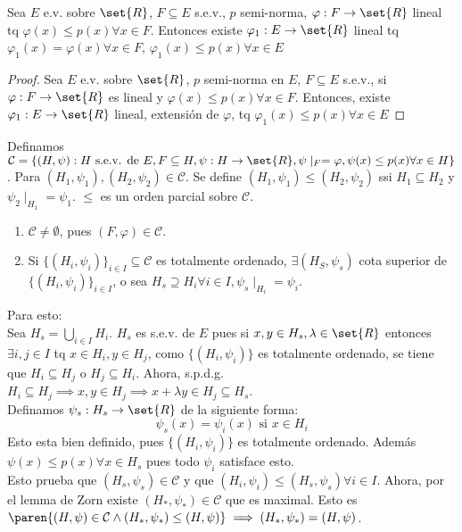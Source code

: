 \documentclass{notetaking}
\begin{document}
\begin{thm}
    Sea \(E\) e.v. sobre \(\set{R}\), \(F\subseteq E\) s.e.v., \(p\) semi-norma, \(\varphi:F\rightarrow\set{R}\) lineal tq \(\varphi(x)\leq p(x)\forall x\in F\). Entonces existe \(\varphi_1:E\rightarrow\set{R}\) lineal tq \(\varphi_1(x)=\varphi(x)\forall x\in F\), \(\varphi_1(x)\leq p(x)\forall x\in E\)
\end{thm}
\begin{proof}
    Sea \(E\) e.v. sobre \(\set{R}\), \(p\) semi-norma en \(E\), \(F\subseteq E\) s.e.v., si \(\varphi:F\rightarrow \set{R}\) es lineal y \(\varphi(x)\leq p(x)\forall x\in F\). Entonces, existe \(\varphi_1:E\rightarrow\set{R}\) lineal, extensión de \(\varphi\), tq \(\varphi_1(x)\leq p(x)\forall x\in E\)
\end{proof}
    Definamos \(\mathcal{C}=\{(H,\psi): H\text{ s.e.v. de }E, F\subseteq H,\psi:H\rightarrow\set{R},\psi\mid_F=\varphi,\psi(x)\leq p(x) \forall x\in H\}\). Para \((H_1,\psi_1),(H_2,\psi_2)\in \mathcal{C}\). Se define \((H_1,\psi_1)\leq(H_2,\psi_2)\) ssi \(H_1\subseteq H_2\) y \(\psi_2\mid_{H_1}=\psi_1\). \(\leq\) es un orden parcial sobre \(\mathcal{C}\).
    \begin{enumerate}
        \item \(\mathcal{C}\neq\emptyset\), pues \((F,\varphi)\in\mathcal{C}\).
        \item Si  \(\{(H_i,\psi_i)\}_{i\in I}\subseteq\mathcal{C}\) es totalmente ordenado, \(\exists (H_S,\psi_s)\) cota superior de \(\{(H_i,\psi_i)\}_{i\in I}\), o sea \(H_s\supseteq H_i\forall i\in I, \psi_s\mid_{H_i}=\psi_i\).
    \end{enumerate}
    Para esto:\\
    Sea \(H_s=\bigcup_{i\in I}H_i\). \(H_s\) es s.e.v. de \(E\) pues si \(x,y\in H_s,\lambda\in\set{R}\) entonces \(\exists i,j\in I\) tq \(x\in H_i,y\in H_j\), como \(\{(H_i,\psi_i)\}\) es totalmente ordenado, se tiene que \(H_i\subseteq H_j\) o \(H_j\subseteq H_i\). Ahora, s.p.d.g. \(H_i\subseteq H_j\implies x,y\in H_j\implies x+\lambda y\in H_j\subseteq H_s\).\\
    Definamos \(\psi_s:H_s\rightarrow\set{R}\) de la siguiente forma:
    \[
        \psi_s(x)=\psi_i(x)\text{ si }x\in H_i
    \]
    Esto esta bien definido, pues \(\{(H_i,\psi_i)\}\) es totalmente ordenado. Además \(\psi(x)\leq p(x)\forall x\in H_s\) pues todo \(\psi_i\) satisface esto.\\
    Esto prueba que \((H_s,\psi_s)\in\mathcal{C}\) y que \((H_i,\psi_i)\leq (H_s,\psi_s)\forall i\in I\). Ahora, por el lemma de Zorn existe \((H_*,\psi_*)\in\mathcal{C}\) que es maximal. Esto es \(\paren{(H,\psi)\in\mathcal{C}\wedge (H_*,\psi_*)\leq (H,\psi)}\implies (H_*,\psi_*)=(H,\psi)\).\\
\end{document}
